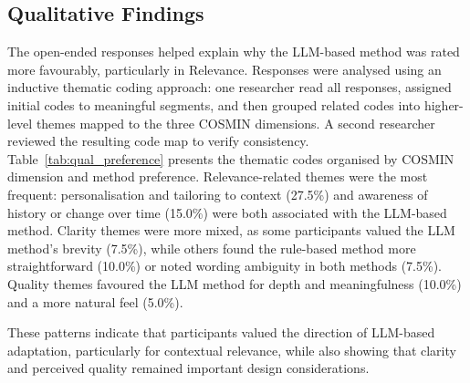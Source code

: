 \documentclass[conference]{IEEEtran}
\begin{document}
\subsection{Qualitative Findings}
\label{subsec:qual}


The open-ended responses helped explain why the LLM-based method was rated
more favourably, particularly in Relevance. Responses were analysed using
an inductive thematic coding approach: one researcher read all responses,
assigned initial codes to meaningful segments, and then grouped related
codes into higher-level themes mapped to the three COSMIN dimensions. A
second researcher reviewed the resulting code map to verify consistency.
Table~\ref{tab:qual_preference} presents the thematic codes organised by
COSMIN dimension and method preference. Relevance-related themes were the
most frequent: personalisation and tailoring to context (27.5\%) and
awareness of history or change over time (15.0\%) were both associated
with the LLM-based method. Clarity themes were more mixed, as some
participants valued the LLM method's brevity (7.5\%), while others found
the rule-based method more straightforward (10.0\%) or noted wording
ambiguity in both methods (7.5\%). Quality themes favoured the LLM
method for depth and meaningfulness (10.0\%) and a more natural feel
(5.0\%).

These patterns indicate that participants valued the direction of
LLM-based adaptation, particularly for contextual relevance, while also
showing that clarity and perceived quality remained important design
considerations.
\end{document}
